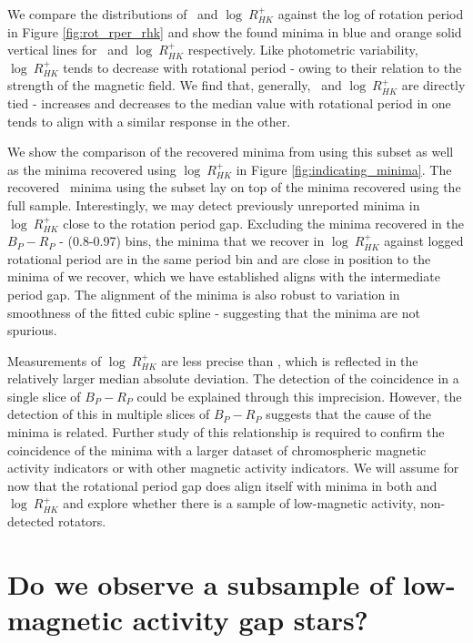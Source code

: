 We compare the distributions of \rper{} \ and $\log \ R^{+}_{HK}$ against the log of rotation period in Figure \ref{fig:rot_rper_rhk} and show the found minima in blue and orange solid vertical lines for \rper{} \ and $\log \ R^{+}_{HK}$ respectively.
Like photometric variability, $\log \ R^{+}_{HK}$ tends to decrease with rotational period - owing to their relation to the strength of the magnetic field.
We find that, generally, \rper{} \ and $\log \ R^{+}_{HK}$ are directly tied - increases and decreases to the median value with rotational period in one tends to align with a similar response in the other.

We show the comparison of the recovered minima from \rper{} using this subset as well as the minima recovered using $\log \ R^{+}_{HK}$ in Figure \ref{fig:indicating_minima}.
The recovered \rper{} \ minima using the subset lay on top of the \rper{} minima recovered using the full sample.
Interestingly, we may detect previously unreported minima in $\log \ R^{+}_{HK}$ close to the rotation period gap.
Excluding the minima recovered in the $B_P-R_P$ - (0.8-0.97) bins, the minima that we recover in $\log \ R^{+}_{HK}$ against logged rotational period are in the same period bin and are close in position to the minima of \rper{} we recover, which we have established aligns with the intermediate period gap.
The alignment of the minima is also robust to variation in smoothness of the fitted cubic spline - suggesting that the minima are not spurious.


Measurements of $\log \ R^{+}_{HK}$ are less precise than \rper{}, which is reflected in the relatively larger median absolute deviation.
The detection of the coincidence in a single slice of $B_P-R_P$ could be explained through this imprecision.
However, the detection of this in multiple slices of $B_P-R_P$ suggests that the cause of the minima is related.
Further study of this relationship is required to confirm the coincidence of the minima with a larger dataset of chromospheric magnetic activity indicators or with other magnetic activity indicators.
We will assume for now that the rotational period gap does align itself with minima in both \rper{} and $\log \ R^{+}_{HK}$ and explore whether there is a sample of low-magnetic activity, non-detected rotators. 

\section{Do we observe a subsample of low-magnetic activity gap stars?}
\label{sec:low_activity_gap}

